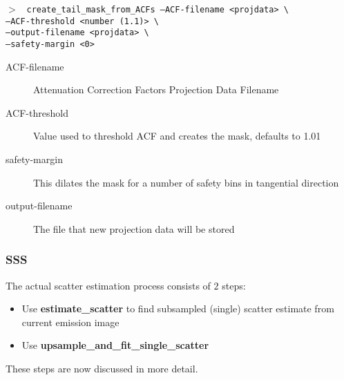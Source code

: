 \documentclass{article}
\newcommand{\cmdline}[1]{\par \noindent $>$ \texttt{#1}\par}
\begin{document}
{\cmdline{%
create\_tail\_mask\_from\_ACFs		--ACF-filename <projdata> \textbackslash \\
					--ACF-threshold <number (1.1)> \textbackslash \\
					--output-filename <projdata> \textbackslash \\
					--safety-margin <0>%
}
\begin{description}
\item[ACF-filename] Attenuation Correction Factors Projection Data Filename
\item[ACF-threshold] Value used to threshold ACF and creates the mask, defaults to 1.01
\item[safety-margin] This dilates the mask for a number of safety bins in tangential direction
\item[output-filename] The file that new projection data will be stored
\end{description}

\subsubsection{SSS}
The actual scatter estimation process consists of $2$ steps:
\begin{itemize} 
\item Use \textbf{estimate\_scatter} to find subsampled (single) scatter estimate from current emission image
\item Use \textbf{upsample\_and\_fit\_single\_scatter}
\end{itemize} 
These steps are now discussed in more detail.\\[1cm]

}
\end{document}
